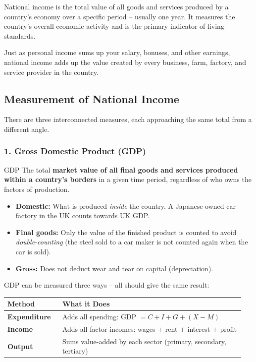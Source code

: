 \documentclass[11pt, a4paper, twoside]{book}
\begin{document}
\begin{coreidea}
National income is the total value of all goods and services produced by a country's economy over a specific period -- usually one year. It measures the country's overall economic activity and is the primary indicator of living standards.
\end{coreidea}

Just as personal income sums up your salary, bonuses, and other earnings, national income adds up the value created by every business, farm, factory, and service provider in the country.

\subsection{Measurement of National Income}

There are three interconnected measures, each approaching the same total from a different angle.

\subsubsection{1. Gross Domestic Product (GDP)}

\begin{keyterm}{GDP}
The total \textbf{market value of all final goods and services produced within a country's borders} in a given time period, regardless of who owns the factors of production.
\end{keyterm}

\begin{itemize}
  \item \textbf{Domestic:} What is produced \emph{inside} the country. A Japanese-owned car factory in the UK counts towards UK GDP.
  \item \textbf{Final goods:} Only the value of the finished product is counted to avoid \emph{double-counting} (the steel sold to a car maker is not counted again when the car is sold).
  \item \textbf{Gross:} Does not deduct wear and tear on capital (depreciation).
\end{itemize}

GDP can be measured three ways -- all should give the same result:

\begin{tcolorbox}[enhanced,colback=LightBlue,colframe=MidBlue!70,arc=0pt,boxrule=0.8pt]
\begin{tabular}{@{}>{\RaggedRight\arraybackslash}p{0.22\linewidth}>{\RaggedRight\arraybackslash}p{0.73\linewidth}@{}}
\textbf{\color{NavyPrimary}Method} & \textbf{\color{NavyPrimary}What it Does} \\
\midrule
\textbf{Expenditure} & Adds all spending: GDP $= C + I + G + (X - M)$ \\
\textbf{Income} & Adds all factor incomes: wages $+$ rent $+$ interest $+$ profit \\
\textbf{Output} & Sums value-added by each sector (primary, secondary, tertiary) \\
\end{tabular}
\end{tcolorbox}
\end{document}
